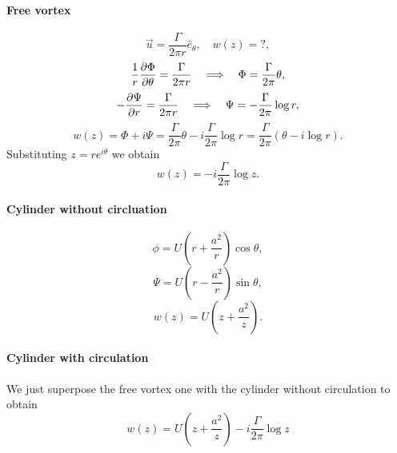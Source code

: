 \documentclass[../main.tex]{subfiles}
\begin{document}
  \paragraph{Free vortex}
  \begin{displaymath}
    \vec u = \frac{\Gamma}{2 \pi r} \hat e_\theta, \quad w(z) = ?,
  \end{displaymath}
  \begin{displaymath}
    \frac{1}{r} \frac{\partial \Phi}{\partial \theta} = \frac{\Gamma}{2 \pi r} \quad \Longrightarrow \quad \Phi = \frac{\Gamma}{2\pi}\theta,
  \end{displaymath}
  \begin{displaymath}
    - \frac{\partial \Psi}{\partial r} = \frac{\Gamma}{2\pi r} \quad \Longrightarrow \quad \Psi = - \frac{\Gamma}{2\pi} \log r,
  \end{displaymath}
  \begin{displaymath}
    w(z) = \Phi + i \Psi = \frac{\Gamma}{2 \pi}\theta - i \frac{\Gamma}{2\pi} \log r = \frac{\Gamma}{2 \pi} ( \theta - i \log r).
  \end{displaymath}
  Substituting $z = r e^{i \theta}$ we obtain 
  \begin{displaymath}
    w(z) = - i \frac{\Gamma}{2 \pi}\log z.
  \end{displaymath}
  
  \paragraph{Cylinder without circluation}
  \begin{displaymath}
    \phi= U \left(r + \frac{a^2}{r}\right) \cos \theta,
  \end{displaymath}
  \begin{displaymath}
    \Psi = U\left( r - \frac{a^2}{r}\right) \sin \theta,
  \end{displaymath}
  \begin{displaymath}
    w(z) = U\left( z + \frac{a^2}{z} \right).
  \end{displaymath}
  
  \paragraph{Cylinder with circulation}
  We just superpose the free vortex one with the cylinder without circulation to obtain
  \begin{displaymath}
    w(z) = U \left( z + \frac{a^2}{z} \right) - i \frac{\Gamma}{2 \pi }\log z
  \end{displaymath}
  
\end{document}
